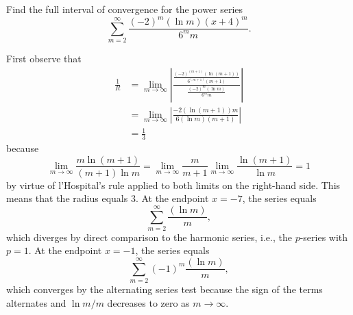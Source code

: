\documentclass{ximera}
\begin{document}
\begin{question}%

Find the full interval of convergence for the power series \[\sum_{m=2}^{\infty} \frac{(-2)^m(\ln m)(x + 4)^m }{6^mm}.\]
\begin{multiplechoice}
\choice{\(\displaystyle \left[-\frac{13}{3},-\frac{11}{3}\right)\)}
\choice[correct]{\(\displaystyle \left(-7,-1\right]\)}
\choice{\(\displaystyle \left[-7,-1\right]\)}
\choice{\(\displaystyle \left(-\infty,\infty\right)\)}
\end{multiplechoice}
\begin{feedback}
First observe that 
\[\begin{aligned}
\frac{1}{R} & = \lim_{m\rightarrow \infty} \left| \frac{\frac{(-2)^{(m+1)}(\ln {(m+1)}) }{6^{(m+1)}{(m+1)}} }{\frac{(-2)^m(\ln m) }{6^mm}} \right| \\
& = \lim_{m\rightarrow \infty} \left| \frac{-2(\ln {(m+1)})m }{6(\ln m){(m+1)} } \right| \\
& = \frac{1}{3}
\end{aligned}\]
because \[\lim_{m \rightarrow \infty} \frac{m\ln (m+1)}{(m+1) \ln m} = \lim_{m \rightarrow \infty} \frac{m}{m+1} \lim_{m \rightarrow \infty} \frac{\ln (m+1)}{\ln m} = 1\] by virtue of l'Hospital's rule applied to both limits on the right-hand side.
This means that the radius equals \(3\). At the endpoint \(x=-7\), the series equals \[\sum_{m=2}^{\infty} \frac{(\ln m) }{m },\] which diverges by direct comparison to the harmonic series, i.e., the \(p\)-series with \(p = 1\). At the endpoint \(x=-1\), the series equals \[\sum_{m=2}^{\infty} (-1)^m\frac{(\ln m) }{m },\] which converges by the alternating series test because the sign of the terms alternates and \(\ln m / m\) decreases to zero as \(m \rightarrow \infty\).
\end{feedback}

\end{question}
\end{document}
